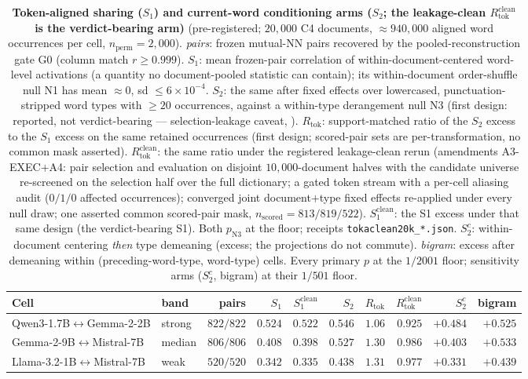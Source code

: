 \begin{table}[h]
\centering
\caption{\textbf{Token-aligned sharing ($S_1$) and current-word conditioning arms ($S_2$; the leakage-clean $R_{\text{tok}}^{\text{clean}}$ is the verdict-bearing arm)} (pre-registered; $20{,}000$ C4 documents, ${\approx}940{,}000$ aligned word occurrences per cell, $n_{\text{perm}}{=}2{,}000$). \emph{pairs}: frozen mutual-NN pairs recovered by the pooled-reconstruction gate G0 (column match $r\ge0.999$). $S_1$: mean frozen-pair correlation of within-document-centered word-level activations (a quantity no document-pooled statistic can contain); its within-document order-shuffle null N1 has mean ${\approx}0$, sd $\le6\times10^{-4}$. $S_2$: the same after fixed effects over lowercased, punctuation-stripped word types with $\ge20$ occurrences, against a within-type derangement null N3 (first design: reported, not verdict-bearing --- selection-leakage caveat, ). $R_{\text{tok}}$: support-matched ratio of the $S_2$ excess to the $S_1$ excess on the same retained occurrences (first design; scored-pair sets are per-transformation, no common mask asserted). $R_{\text{tok}}^{\text{clean}}$: the same ratio under the registered leakage-clean rerun (amendments A3-EXEC$+$A4: pair selection and evaluation on disjoint $10{,}000$-document halves with the candidate universe re-screened on the selection half over the full dictionary; a gated token stream with a per-cell aliasing audit ($0/1/0$ affected occurrences); converged joint document$+$type fixed effects re-applied under every null draw; one asserted common scored-pair mask, $n_{\text{scored}}{=}813/819/522$). $S_1^{\text{clean}}$: the S1 excess under that same design (the verdict-bearing S1). Both $p_{\text{N3}}$ at the floor; receipts \texttt{tokaclean20k\_*.json}. $S_2^{c}$: within-document centering \emph{then} type demeaning (excess; the projections do not commute). \emph{bigram}: excess after demeaning within (preceding-word-type, word-type) cells. Every primary $p$ at the $1/2001$ floor; sensitivity arms ($S_2^{c}$, bigram) at their $1/501$ floor.}
\label{tab:tokalign}
\footnotesize\setlength{\tabcolsep}{3pt}
\begin{tabular}{llrrrrrrrr}
\toprule
Cell & band & pairs & $S_1$ & $S_1^{\text{clean}}$ & $S_2$ & $R_{\text{tok}}$ & $R_{\text{tok}}^{\text{clean}}$ & $S_2^{c}$ & bigram \\
\midrule
Qwen3-1.7B$\leftrightarrow$Gemma-2-2B & strong & $822/822$ & $0.524$ & $0.522$ & $0.546$ & $1.06$ & $0.925$ & $+0.484$ & $+0.525$ \\
Gemma-2-9B$\leftrightarrow$Mistral-7B & median & $806/806$ & $0.408$ & $0.398$ & $0.527$ & $1.30$ & $0.986$ & $+0.403$ & $+0.533$ \\
Llama-3.2-1B$\leftrightarrow$Mistral-7B & weak & $520/520$ & $0.342$ & $0.335$ & $0.438$ & $1.31$ & $0.977$ & $+0.331$ & $+0.439$ \\
\bottomrule
\end{tabular}
\end{table}
